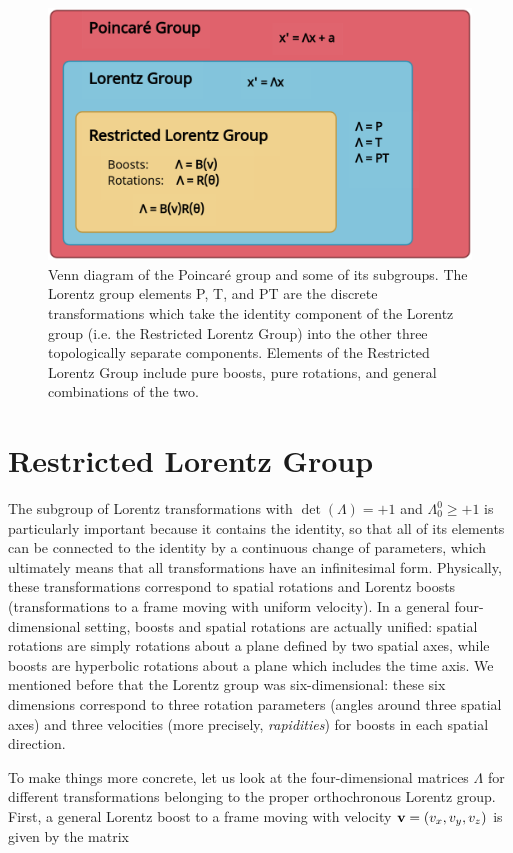 \documentclass[12pt,a4paper,notitlepage]{report}
\begin{document}
%
\begin{figure}[h]
  \centering
  \includegraphics[width=.7\textwidth]{../Figuras/grupo-poincare.eps}
  \captionsetup{font=footnotesize, margin=8pt}
  \caption{Venn diagram of the Poincaré group and some of its subgroups. The Lorentz group elements P, T, and PT are the discrete transformations which take the identity component of the Lorentz group (i.e. the Restricted Lorentz Group) into the other three topologically separate components. Elements of the Restricted Lorentz Group include pure boosts, pure rotations, and general combinations of the two.}
  \label{poincare-subgroups}
\end{figure}
%

\section{Restricted Lorentz Group}

The subgroup of Lorentz transformations with $\det(\Lambda) = +1$ and $\Lambda^0_0 \geqslant +1$ is particularly important because it contains the identity, so that all of its elements can be connected to the identity by a continuous change of parameters, which ultimately means that all transformations have an infinitesimal form. Physically, these transformations correspond to spatial rotations and Lorentz boosts (transformations to a frame moving with uniform velocity). In a general four-dimensional setting, boosts and spatial rotations are actually unified: spatial rotations are simply rotations about a plane defined by two spatial axes, while boosts are hyperbolic rotations about a plane which includes the time axis. We mentioned before that the Lorentz group was six-dimensional: these six dimensions correspond to three rotation parameters (angles around three spatial axes) and three velocities (more precisely, {\it rapidities}) for boosts in each spatial direction.

To make things more concrete, let us look at the four-dimensional matrices $\Lambda$ for different transformations belonging to the proper orthochronous Lorentz group. First, a general Lorentz boost to a frame moving with velocity $\vb{v} = (v_x,v_y,v_z)$ is given by the matrix
\end{document}
